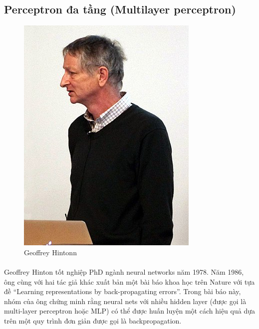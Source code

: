 \documentclass{report}
\newcommand\tab[1][1.25cm]{\hspace*{#1}}
\begin{document}
            \subsection{Perceptron đa tầng (Multilayer perceptron)}
                \begin{figure}
                    \includegraphics[scale=0.34]{image/330px-Geoffrey_Hinton_at_UBC.jpg}
                    \caption{\centering Geoffrey Hintonn}
                \end{figure}\leavevmode
                \tab[0.5cm]\fontsize{13}{10}\selectfont\paragraph{}
                    Geoffrey Hinton tốt nghiệp PhD ngành neural networks năm 1978. Năm 1986, ông cùng với hai tác giả khác xuất bản một bài báo khoa học trên Nature với tựa đề “Learning representations by back-propagating errors”. Trong bài báo này, nhóm của ông chứng minh rằng neural nets với nhiều hidden layer (được gọi là multi-layer perceptron hoặc MLP) có thể được huấn luyện một cách hiệu quả dựa trên một quy trình đơn giản được gọi là backpropagation.\paragraph{}\leavevmode\\\leavevmode\\\leavevmode\newline\leavevmode\leavevmode\\
\end{document}
